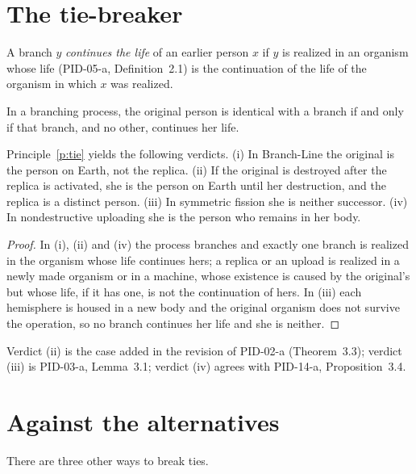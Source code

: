 \documentclass{situationist-preprint}
\begin{document}
\section{The tie-breaker}

\begin{definition}\label{d:life}
A branch $y$ \emph{continues the life} of an earlier person $x$ if $y$ is realized in an organism whose life (PID-05-a, Definition~2.1) is the continuation of the life of the organism in which $x$ was realized.
\end{definition}

\begin{principle}\label{p:tie}
In a branching process, the original person is identical with a branch if and only if that branch, and no other, continues her life.
\end{principle}

\begin{proposition}\label{p:verdicts}
Principle~\ref{p:tie} yields the following verdicts. (i) In Branch-Line the original is the person on Earth, not the replica. (ii) If the original is destroyed after the replica is activated, she is the person on Earth until her destruction, and the replica is a distinct person. (iii) In symmetric fission she is neither successor. (iv) In nondestructive uploading she is the person who remains in her body.
\end{proposition}

\begin{proof}
In (i), (ii) and (iv) the process branches and exactly one branch is realized in the organism whose life continues hers; a replica or an upload is realized in a newly made organism or in a machine, whose existence is caused by the original's but whose life, if it has one, is not the continuation of hers. In (iii) each hemisphere is housed in a new body and the original organism does not survive the operation, so no branch continues her life and she is neither.
\end{proof}

Verdict (ii) is the case added in the revision of PID-02-a (Theorem~3.3); verdict (iii) is PID-03-a, Lemma~3.1; verdict (iv) agrees with PID-14-a, Proposition~3.4.

\section{Against the alternatives}

There are three other ways to break ties.
\end{document}
